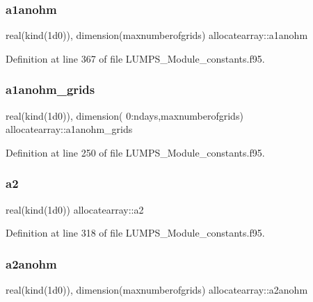 \mbox{\label{namespaceallocatearray_a9f0b71fb7110ca245554e33daaead7b9}} 
\subsubsection{\texorpdfstring{a1anohm}{a1anohm}}
{\footnotesize\ttfamily real(kind(1d0)), dimension(maxnumberofgrids) allocatearray\+::a1anohm}



Definition at line 367 of file L\+U\+M\+P\+S\+\_\+\+Module\+\_\+constants.\+f95.

\mbox{\label{namespaceallocatearray_a7ee45a16de162e892800412aaf12860f}} 
\subsubsection{\texorpdfstring{a1anohm\+\_\+grids}{a1anohm\_grids}}
{\footnotesize\ttfamily real(kind(1d0)), dimension( 0\+:ndays,maxnumberofgrids) allocatearray\+::a1anohm\+\_\+grids}



Definition at line 250 of file L\+U\+M\+P\+S\+\_\+\+Module\+\_\+constants.\+f95.

\mbox{\label{namespaceallocatearray_a0cad51c36be0d8e5f907e24f9c391e4e}} 
\subsubsection{\texorpdfstring{a2}{a2}}
{\footnotesize\ttfamily real(kind(1d0)) allocatearray\+::a2}



Definition at line 318 of file L\+U\+M\+P\+S\+\_\+\+Module\+\_\+constants.\+f95.

\mbox{\label{namespaceallocatearray_a4e8efd0e638a21f7639966960c6464cd}} 
\subsubsection{\texorpdfstring{a2anohm}{a2anohm}}
{\footnotesize\ttfamily real(kind(1d0)), dimension(maxnumberofgrids) allocatearray\+::a2anohm}



